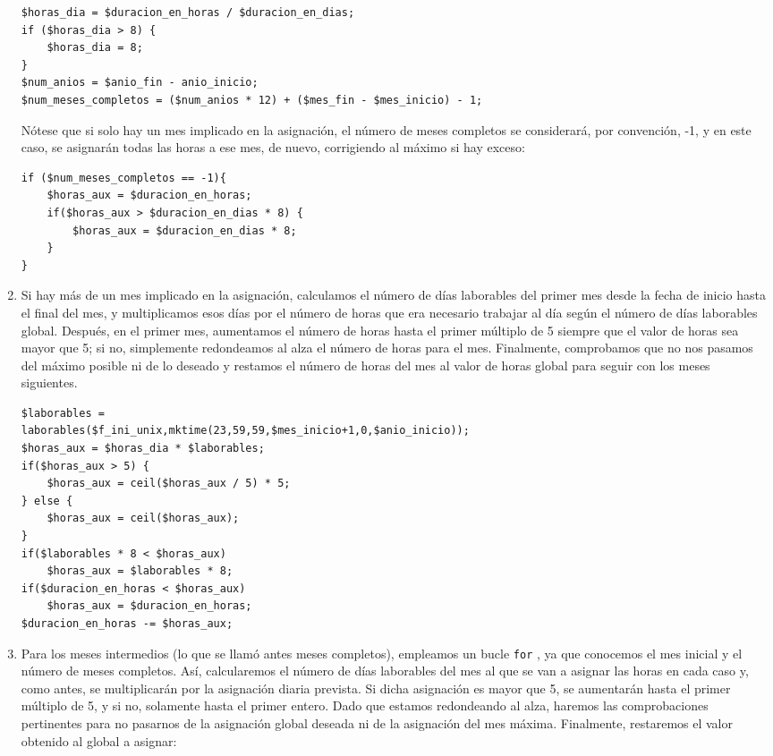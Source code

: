 \begin{enumerate}
\begin{lstlisting}
$horas_dia = $duracion_en_horas / $duracion_en_dias;
if ($horas_dia > 8) {
	$horas_dia = 8;
}
$num_anios = $anio_fin - anio_inicio;
$num_meses_completos = ($num_anios * 12) + ($mes_fin - $mes_inicio) - 1;
\end{lstlisting}

Nótese que si solo hay un mes implicado en la asignación, el número de meses
completos se considerará, por convención, -1, y en este caso, se asignarán
todas las horas a ese mes, de nuevo, corrigiendo al máximo si hay exceso:

\begin{lstlisting}
if ($num_meses_completos == -1){
	$horas_aux = $duracion_en_horas;
	if($horas_aux > $duracion_en_dias * 8) {
		$horas_aux = $duracion_en_dias * 8;
	}
}
\end{lstlisting}

\item Si hay más de un mes implicado en la asignación, calculamos el número de
días laborables del primer mes desde la fecha de inicio hasta el final del mes,
y multiplicamos esos días por el número de horas que era necesario trabajar al
día según el número de días laborables global. Después, en el primer mes,
aumentamos el número de horas hasta el primer múltiplo de 5 siempre que el
valor de horas sea mayor que 5; si no, simplemente redondeamos al alza el número
de horas para el mes. Finalmente, comprobamos que no nos pasamos del máximo
posible ni de lo deseado y restamos el número de horas del mes al valor de horas
global para seguir con los meses siguientes.

\begin{lstlisting}
$laborables =
laborables($f_ini_unix,mktime(23,59,59,$mes_inicio+1,0,$anio_inicio));
$horas_aux = $horas_dia * $laborables;
if($horas_aux > 5) {
	$horas_aux = ceil($horas_aux / 5) * 5;
} else {
	$horas_aux = ceil($horas_aux);
}
if($laborables * 8 < $horas_aux)
	$horas_aux = $laborables * 8;
if($duracion_en_horas < $horas_aux)
	$horas_aux = $duracion_en_horas;
$duracion_en_horas -= $horas_aux;
\end{lstlisting}

\item Para los meses intermedios (lo que se llamó antes meses completos),
empleamos un bucle \verb|for| , ya que conocemos el mes inicial y el número de
meses completos. Así, calcularemos el número de días laborables del mes al que
se van a asignar las horas en cada caso y, como antes, se multiplicarán por la
asignación diaria prevista. Si dicha asignación es mayor que 5, se aumentarán
hasta el primer múltiplo de 5, y si no, solamente hasta el primer entero. Dado
que estamos redondeando al alza, haremos las comprobaciones pertinentes para no
pasarnos de la asignación global deseada ni de la asignación del mes máxima.
Finalmente, restaremos el valor obtenido al global a asignar:


\end{enumerate}
